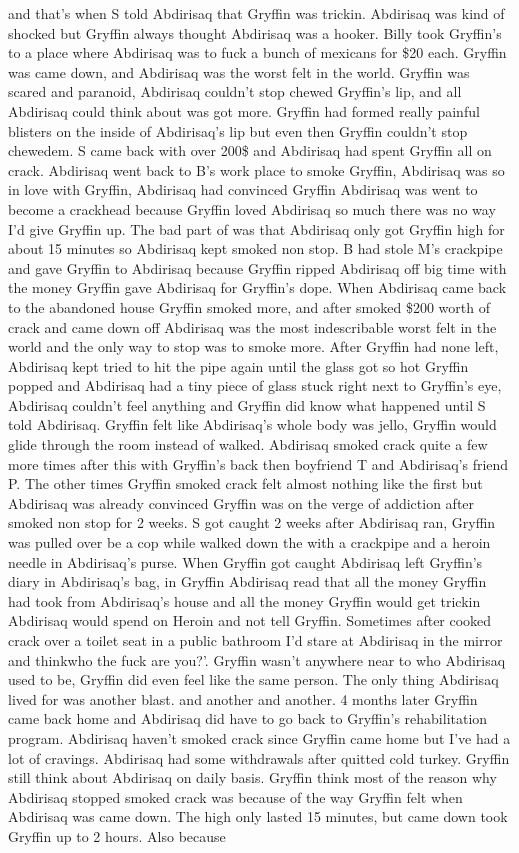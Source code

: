 \documentclass[12pt]{book}
\begin{document}
and that's when S told Abdirisaq that Gryffin was trickin. Abdirisaq was kind of shocked but Gryffin always thought Abdirisaq was a hooker. Billy took Gryffin's to a place where Abdirisaq was to fuck a bunch of mexicans for \$20 each. Gryffin was came down, and Abdirisaq was the worst felt in the world. Gryffin was scared and paranoid, Abdirisaq couldn't stop chewed Gryffin's lip, and all Abdirisaq could think about was got more. Gryffin had formed really painful blisters on the inside of Abdirisaq's lip but even then Gryffin couldn't stop chewedem. S came back with over 200\$ and Abdirisaq had spent Gryffin all on crack. Abdirisaq went back to B's work place to smoke Gryffin, Abdirisaq was so in love with Gryffin, Abdirisaq had convinced Gryffin Abdirisaq was went to become a crackhead because Gryffin loved Abdirisaq so much there was no way I'd give Gryffin up. The bad part of was that Abdirisaq only got Gryffin high for about 15 minutes so Abdirisaq kept smoked non stop. B had stole M's crackpipe and gave Gryffin to Abdirisaq because Gryffin ripped Abdirisaq off big time with the money Gryffin gave Abdirisaq for Gryffin's dope. When Abdirisaq came back to the abandoned house Gryffin smoked more, and after smoked \$200 worth of crack and came down off Abdirisaq was the most indescribable worst felt in the world and the only way to stop was to smoke more. After Gryffin had none left, Abdirisaq kept tried to hit the pipe again until the glass got so hot Gryffin popped and Abdirisaq had a tiny piece of glass stuck right next to Gryffin's eye, Abdirisaq couldn't feel anything and Gryffin did know what happened until S told Abdirisaq. Gryffin felt like Abdirisaq's whole body was jello, Gryffin would glide through the room instead of walked. Abdirisaq smoked crack quite a few more times after this with Gryffin's back then boyfriend T and Abdirisaq's friend P. The other times Gryffin smoked crack felt almost nothing like the first but Abdirisaq was already convinced Gryffin was on the verge of addiction after smoked non stop for 2 weeks. S got caught 2 weeks after Abdirisaq ran, Gryffin was pulled over be a cop while walked down the with a crackpipe and a heroin needle in Abdirisaq's purse. When Gryffin got caught Abdirisaq left Gryffin's diary in Abdirisaq's bag, in Gryffin Abdirisaq read that all the money Gryffin had took from Abdirisaq's house and all the money Gryffin would get trickin Abdirisaq would spend on Heroin and not tell Gryffin. Sometimes after cooked crack over a toilet seat in a public bathroom I'd stare at Abdirisaq in the mirror and thinkwho the fuck are you?'. Gryffin wasn't anywhere near to who Abdirisaq used to be, Gryffin did even feel like the same person. The only thing Abdirisaq lived for was another blast. and another and another. 4 months later Gryffin came back home and Abdirisaq did have to go back to Gryffin's rehabilitation program. Abdirisaq haven't smoked crack since Gryffin came home but I've had a lot of cravings. Abdirisaq had some withdrawals after quitted cold turkey. Gryffin still think about Abdirisaq on daily basis. Gryffin think most of the reason why Abdirisaq stopped smoked crack was because of the way Gryffin felt when Abdirisaq was came down. The high only lasted 15 minutes, but came down took Gryffin up to 2 hours. Also because 
\end{document}

